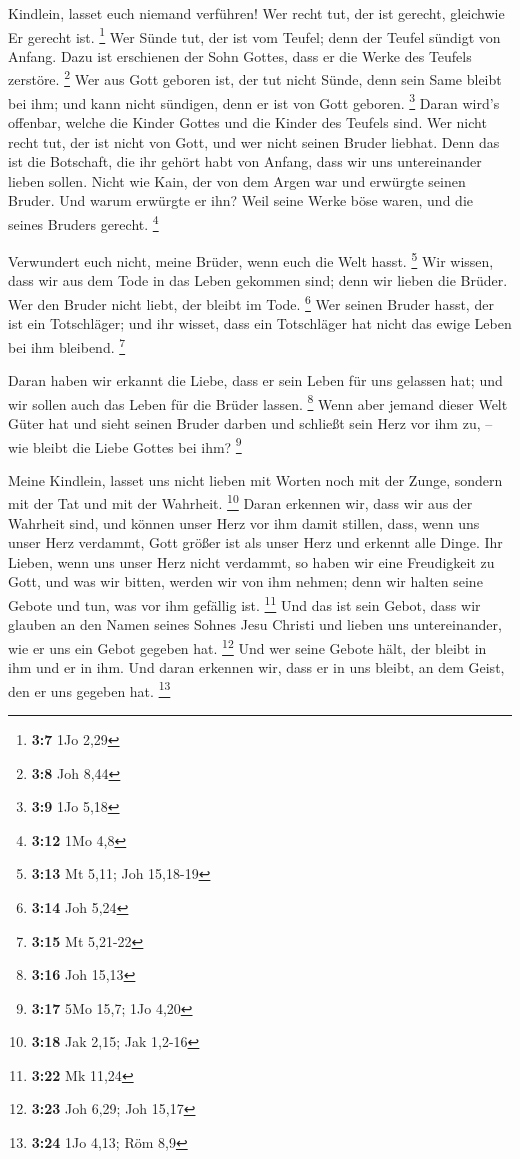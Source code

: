  Kindlein, lasset euch niemand verführen! Wer recht tut,
der ist gerecht, gleichwie Er gerecht ist. \footnote{\textbf{3:7} 1Jo
  2,29}  Wer Sünde tut, der ist vom Teufel; denn der
Teufel sündigt von Anfang. Dazu ist erschienen der Sohn Gottes, dass er
die Werke des Teufels zerstöre. \footnote{\textbf{3:8} Joh 8,44}
 Wer aus Gott geboren ist, der tut nicht Sünde, denn sein
Same bleibt bei ihm; und kann nicht sündigen, denn er ist von Gott
geboren. \footnote{\textbf{3:9} 1Jo 5,18}  Daran wird's
offenbar, welche die Kinder Gottes und die Kinder des Teufels sind. Wer
nicht recht tut, der ist nicht von Gott, und wer nicht seinen Bruder
liebhat.  Denn das ist die Botschaft, die ihr gehört habt
von Anfang, dass wir uns untereinander lieben sollen. 
Nicht wie Kain, der von dem Argen war und erwürgte seinen Bruder. Und
warum erwürgte er ihn? Weil seine Werke böse waren, und die seines
Bruders gerecht. \footnote{\textbf{3:12} 1Mo 4,8}

 Verwundert euch nicht, meine Brüder, wenn euch die Welt
hasst. \footnote{\textbf{3:13} Mt 5,11; Joh 15,18-19} 
Wir wissen, dass wir aus dem Tode in das Leben gekommen sind; denn wir
lieben die Brüder. Wer den Bruder nicht liebt, der bleibt im Tode.
\footnote{\textbf{3:14} Joh 5,24}  Wer seinen Bruder
hasst, der ist ein Totschläger; und ihr wisset, dass ein Totschläger hat
nicht das ewige Leben bei ihm bleibend. \footnote{\textbf{3:15} Mt
  5,21-22}

 Daran haben wir erkannt die Liebe, dass er sein Leben
für uns gelassen hat; und wir sollen auch das Leben für die Brüder
lassen. \footnote{\textbf{3:16} Joh 15,13}  Wenn aber
jemand dieser Welt Güter hat und sieht seinen Bruder darben und schließt
sein Herz vor ihm zu, -- wie bleibt die Liebe Gottes bei ihm?
\footnote{\textbf{3:17} 5Mo 15,7; 1Jo 4,20}

 Meine Kindlein, lasset uns nicht lieben mit Worten noch
mit der Zunge, sondern mit der Tat und mit der Wahrheit. \footnote{\textbf{3:18}
  Jak 2,15; Jak 1,2-16}  Daran erkennen wir, dass wir aus
der Wahrheit sind, und können unser Herz vor ihm damit stillen,
 dass, wenn uns unser Herz verdammt, Gott größer ist als
unser Herz und erkennt alle Dinge.  Ihr Lieben, wenn uns
unser Herz nicht verdammt, so haben wir eine Freudigkeit zu Gott,
 und was wir bitten, werden wir von ihm nehmen; denn wir
halten seine Gebote und tun, was vor ihm gefällig ist. \footnote{\textbf{3:22}
  Mk 11,24}  Und das ist sein Gebot, dass wir glauben an
den Namen seines Sohnes Jesu Christi und lieben uns untereinander, wie
er uns ein Gebot gegeben hat. \footnote{\textbf{3:23} Joh 6,29; Joh
  15,17}  Und wer seine Gebote hält, der bleibt in ihm
und er in ihm. Und daran erkennen wir, dass er in uns bleibt, an dem
Geist, den er uns gegeben hat. \footnote{\textbf{3:24} 1Jo 4,13; Röm 8,9}

